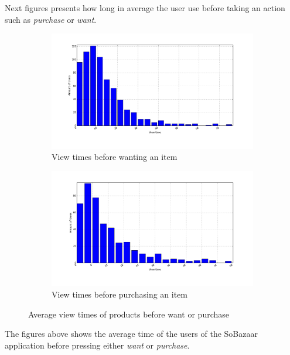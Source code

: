         Next figures presents how long in average the user use before taking an action such as \emph{purchase} or \emph{want}.

    \begin{figure}[H]
        \centering
        \begin{subfigure}{.5\textwidth}
            \centering
            \includegraphics[width=\dualGraphWidth]{image/product_wanteddistribution.png}
            \caption{View times before wanting an item}
    \label{figure:viewWant}
        \end{subfigure}%
        \begin{subfigure}{.5\textwidth}
            \centering
            \includegraphics[width=\dualGraphWidth]{image/product_purchase_intendeddistribution.png}
            \caption{View times before purchasing an item}
    \label{figure:viewBuy}
        \end{subfigure}
        \caption{Average view times of products before want or purchase}
    \end{figure}
        The figures above shows the average time of the users of the SoBazaar application before pressing either \emph{want} or \emph{purchase}.

